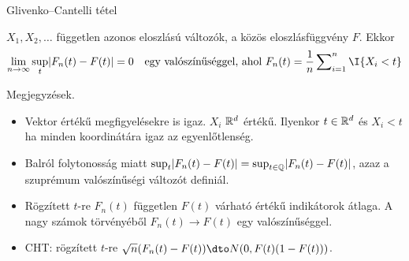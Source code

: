 \documentclass[aspectratio=169,notheorems,9pt,\option]{beamer}
\begin{document}
\begin{frame}{Glivenko--Cantelli tétel}
  \begin{theorem}
    $X_1,X_2,\dots$ független azonos eloszlású változók, a közös
    eloszlásfüggvény $F$.
    Ekkor
    \begin{displaymath}
      \lim_{n\to\infty}\sup_t \abs*{F_n (t)-F (t)}=0\quad
      \text{egy valószínűséggel, ahol $F_n(t)=\frac1n\sum\nolimits_{i=1}^n \I{X_i<t}$} %
    \end{displaymath}
  \end{theorem}
  Megjegyzések.
  \begin{itemize}
  \item Vektor értékű megfigyelésekre is igaz. $X_i$ $\mathbb{R}^d$
    értékű. Ilyenkor $t\in\mathbb{R}^d$ és $X_i<t$ ha minden koordinátára
    igaz az egyenlőtlenség.
  \item Balról folytonosság miatt $\sup_{t}\abs*{F_n (t)-F (t)}=\sup_{t\in\Q}\abs*{F_n (t)-F
      (t)}$, azaz a szuprémum valószínűségi változót definiál.
  \item Rögzített $t$-re $F_n (t)$ független $F (t)$ várható értékű
    indikátorok átlaga. A nagy számok törvényéből $F_n (t)\to F (t)$ egy
    valószínűséggel.
    
  \item CHT: rögzített $t$-re $\sqrt{n}(F_n (t)-F (t))\dto N (0,F (t) (1-F (t)))$.
  \end{itemize}
\end{frame}
\end{document}
